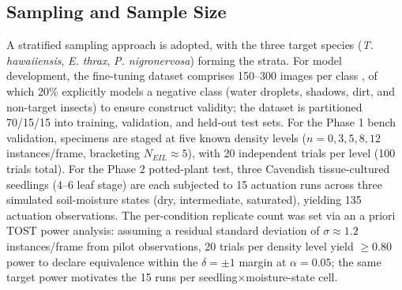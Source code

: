 \documentclass[conference]{IEEEtran}
\begin{document}
\begin{table}[htbp]
\caption{Estimated Bill of Materials (BoM) per Node}
\label{tab:bom}
\centering
{}
\end{table}

\subsection{Sampling and Sample Size}
A stratified sampling approach is adopted, with the three target species (\textit{T. hawaiiensis}, \textit{E. thrax}, \textit{P. nigronervosa}) forming the strata. For model development, the fine-tuning dataset comprises 150--300 images per class \cite{hayajneh2023}, of which 20\% explicitly models a negative class (water droplets, shadows, dirt, and non-target insects) to ensure construct validity; the dataset is partitioned 70/15/15 into training, validation, and held-out test sets. For the Phase 1 bench validation, specimens are staged at five known density levels ($n = 0, 3, 5, 8, 12$ instances/frame, bracketing $N_{EIL} \approx 5$), with 20 independent trials per level (100 trials total). For the Phase 2 potted-plant test, three Cavendish tissue-cultured seedlings (4--6 leaf stage) are each subjected to 15 actuation runs across three simulated soil-moisture states (dry, intermediate, saturated), yielding 135 actuation observations. The per-condition replicate count was set via an a priori TOST power analysis: assuming a residual standard deviation of $\sigma \approx 1.2$ instances/frame from pilot observations, 20 trials per density level yield $\geq 0.80$ power to declare equivalence within the $\delta = \pm 1$ margin at $\alpha = 0.05$; the same target power motivates the 15 runs per seedling$\times$moisture-state cell. %
\end{document}
